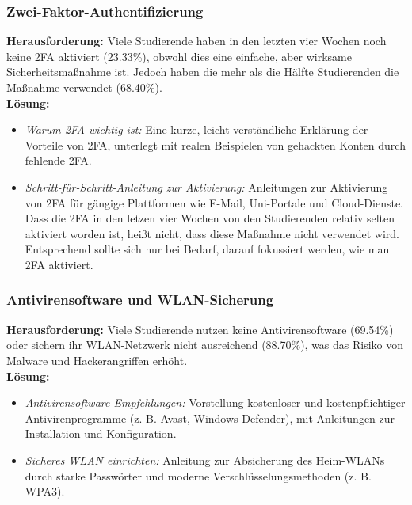 \documentclass[german,report]{i1thesis}
\begin{document}
\subsubsection{Zwei-Faktor-Authentifizierung}
\textbf{Herausforderung:} Viele Studierende haben in den letzten vier Wochen noch keine 2FA aktiviert (23.33\%), obwohl dies eine einfache, aber wirksame Sicherheitsmaßnahme ist. Jedoch haben die mehr als die Hälfte Studierenden die Maßnahme verwendet (68.40\%). \\
\textbf{Lösung:}
\begin{itemize}
    \item \textit{Warum 2FA wichtig ist:} Eine kurze, leicht verständliche Erklärung der Vorteile von 2FA, unterlegt mit realen Beispielen von gehackten Konten durch fehlende 2FA.
    \item \textit{Schritt-für-Schritt-Anleitung zur Aktivierung:} Anleitungen zur Aktivierung von 2FA für gängige Plattformen wie E-Mail, Uni-Portale und Cloud-Dienste. Dass die 2FA in den letzen vier Wochen von den Studierenden relativ selten aktiviert worden ist, heißt nicht, dass diese Maßnahme nicht verwendet wird. Entsprechend sollte sich nur bei Bedarf, darauf fokussiert werden, wie man 2FA aktiviert.
\end{itemize}

\subsubsection{Antivirensoftware und WLAN-Sicherung}
\textbf{Herausforderung:} Viele Studierende nutzen keine Antivirensoftware (69.54\%) oder sichern ihr WLAN-Netzwerk nicht ausreichend (88.70\%), was das Risiko von Malware und Hackerangriffen erhöht. \\
\textbf{Lösung:}
\begin{itemize}
    \item \textit{Antivirensoftware-Empfehlungen:} Vorstellung kostenloser und kostenpflichtiger Antivirenprogramme (z. B. Avast, Windows Defender), mit Anleitungen zur Installation und Konfiguration.
    \item \textit{Sicheres WLAN einrichten:} Anleitung zur Absicherung des Heim-WLANs durch starke Passwörter und moderne Verschlüsselungsmethoden (z. B. WPA3).
\end{itemize}
\end{document}
